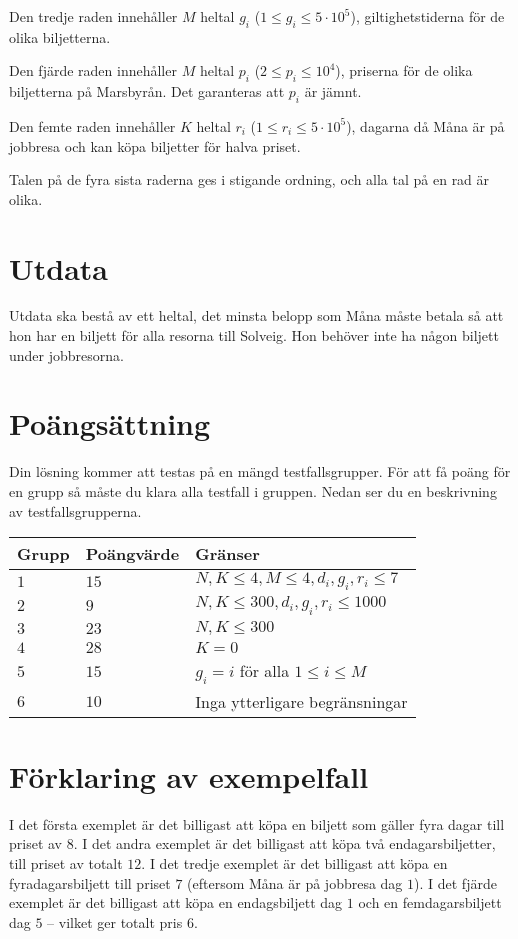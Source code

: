 Den tredje raden innehåller $M$ heltal $g_i$ ($1 \leq g_i \leq 5\cdot10^5$), giltighetstiderna för de olika biljetterna.

Den fjärde raden innehåller $M$ heltal $p_i$ ($2 \leq p_i \leq 10^4$), priserna för de olika biljetterna på Marsbyrån. Det garanteras att $p_i$ är jämnt.

Den femte raden innehåller $K$ heltal $r_i$ ($1 \leq r_i \leq 5\cdot10^5$), dagarna då Måna är på jobbresa och kan köpa biljetter för halva priset.

Talen på de fyra sista raderna ges i stigande ordning, och alla tal på en rad är olika.

\section*{Utdata}
Utdata ska bestå av ett heltal, det minsta belopp som Måna måste betala så att hon har en biljett för alla resorna till Solveig. Hon behöver inte ha någon biljett under jobbresorna.

\section*{Poängsättning}
Din lösning kommer att testas på en mängd testfallsgrupper.
För att få poäng för en grupp så måste du klara alla testfall i gruppen.
Nedan ser du en beskrivning av testfallsgrupperna.

\noindent
\begin{tabular}{| l | l | l |}
\hline
Grupp & Poängvärde & Gränser \\ \hline
$1$    & $15$         & $N, K\leq 4, M\leq 4, d_i,g_i,r_i\leq 7$ \\ \hline
$2$    & $9$         & $N, K\leq 300, d_i,g_i,r_i\leq 1000$ \\ \hline
$3$    & $23$         & $N, K\leq 300$ \\ \hline
$4$    & $28$         & $K=0$ \\ \hline
$5$    & $15$         & $g_i=i$ för alla $1\leq i\leq M$ \\ \hline
$6$    & $10$         & Inga ytterligare begränsningar \\ \hline
\end{tabular}

\section*{Förklaring av exempelfall}
I det första exemplet är det billigast att köpa en biljett som gäller fyra dagar till priset av $8$.
I det andra exemplet är det billigast att köpa två endagarsbiljetter, till priset av totalt $12$.
I det tredje exemplet är det billigast att köpa en fyradagarsbiljett till priset $7$ (eftersom Måna är på jobbresa dag $1$).
I det fjärde exemplet är det billigast att köpa en endagsbiljett dag $1$ och en femdagarsbiljett dag $5$ -- vilket ger totalt pris $6$.
